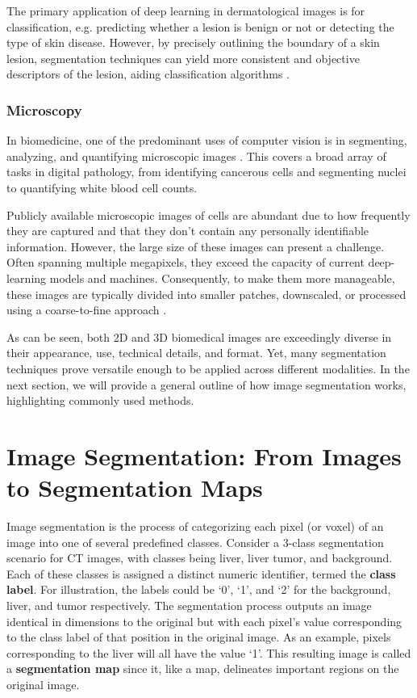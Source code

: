 The primary application of deep learning in dermatological images is for classification, e.g. predicting whether a lesion is benign or not or detecting the type of skin disease. However, by precisely outlining the boundary of a skin lesion, segmentation techniques can yield more consistent and objective descriptors of the lesion, aiding classification algorithms \cite{rotembergPatientcentricDatasetImages2021}.

\subsubsection{Microscopy}

In biomedicine, one of the predominant uses of computer vision is in segmenting, analyzing, and quantifying microscopic images \cite{khanAutoCellSegRobustAutomatic2018}. This covers a broad array of tasks in digital pathology, from identifying cancerous cells and segmenting nuclei to quantifying white blood cell counts.

Publicly available microscopic images of cells are abundant due to how frequently they are captured and that they don't contain any personally identifiable information. However, the large size of these images can present a challenge. Often spanning multiple megapixels, they exceed the capacity of current deep-learning models and machines. Consequently, to make them more manageable, these images are typically divided into smaller patches, downscaled, or processed using a coarse-to-fine approach \cite{jhaInstanceSegmentationWhole2021a}.

As can be seen, both 2D and 3D biomedical images are exceedingly diverse in their appearance, use, technical details, and format. Yet, many segmentation techniques prove versatile enough to be applied across different modalities. In the next section, we will provide a general outline of how image segmentation works, highlighting commonly used methods.

\section{Image Segmentation: From Images to Segmentation Maps}

Image segmentation is the process of categorizing each pixel (or voxel) of an image into one of several predefined classes. Consider a 3-class segmentation scenario for CT images, with classes being liver, liver tumor, and background. Each of these classes is assigned a distinct numeric identifier, termed the \textbf{class label}. For illustration, the labels could be `0', `1', and `2' for the background, liver, and tumor respectively. The segmentation process outputs an image identical in dimensions to the original but with each pixel's value corresponding to the class label of that position in the original image. As an example, pixels corresponding to the liver will all have the value `1'. This resulting image is called a \textbf{segmentation map} since it, like a map, delineates important regions on the original image. 

